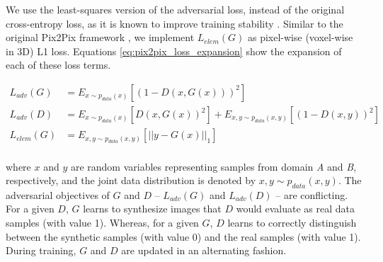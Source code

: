 We use the least-squares version of the adversarial loss, instead of the original cross-entropy loss, as it is known to improve training stability \cite{mao2017least}. Similar to the original Pix2Pix framework \cite{isola2017image}, we implement $L_{elem}(G)$ as pixel-wise (voxel-wise in 3D) L1 loss. Equations \ref{eq:pix2pix_loss_expansion} show the expansion of each of these loss terms.

\begin{equation}
    \begin{aligned}
    L_{adv}(G) &= E_{x \sim p_{data}(x)} [(1 - D(x, G(x)))^2]  \\
    L_{adv}(D) &= E_{x \sim p_{data}(x)} [D(x, G(x))^2] + E_{x,y \sim p_{data}(x,y)} [(1 - D(x,y))^2] \\
    L_{elem}(G) &= E_{x,y \sim p_{data}(x,y)} [|| y - G(x) ||_1]  \\
    \end{aligned}
    \label{eq:pix2pix_loss_expansion}
\end{equation}

where $x$ and $y$ are random variables representing samples from domain \textit{A} and \textit{B}, respectively, and the joint data distribution is denoted by $x,y \sim p_{data}(x,y)$. The adversarial objectives of $G$ and $D$ -- $L_{adv}(G)$ and $L_{adv}(D)$ -- are conflicting. For a given $D$, $G$ learns to synthesize images that $D$ would evaluate as real data samples (with value 1). Whereas, for a given $G$, $D$ learns to correctly distinguish between the synthetic samples (with value 0) and the real samples (with value 1). During training, $G$ and $D$ are updated in an alternating fashion.


